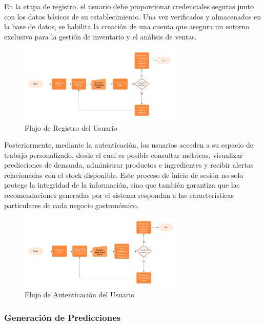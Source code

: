 En la etapa de registro, el usuario debe proporcionar credenciales seguras junto con los datos básicos de su establecimiento. Una vez verificados y almacenados en la base de datos, se habilita la creación de una cuenta que asegura un entorno exclusivo para la gestión de inventario y el análisis de ventas.

\begin{figure}[htbp]
    \centering
    \includegraphics[width=0.7\textwidth]{images/DiagramaRegistroDeUsuario.png}
    \caption{Flujo de Registro del Usuario}
    \label{fig:flujo-registro}
\end{figure}

Posteriormente, mediante la autenticación, los usuarios acceden a su espacio de trabajo personalizado, desde el cual es posible consultar métricas, visualizar predicciones de demanda, administrar productos e ingredientes y recibir alertas relacionadas con el stock disponible. Este proceso de inicio de sesión no solo protege la integridad de la información, sino que también garantiza que las recomendaciones generadas por el sistema respondan a las características particulares de cada negocio gastronómico.

\begin{figure}[htbp]
    \centering
    \includegraphics[width=0.7\textwidth]{images/DiagramaInicioDeSesion.png}
    \caption{Flujo de Autenticación del Usuario}
    \label{fig:flujo-autenticacion}
\end{figure}

\subsubsection{Generación de Predicciones}

